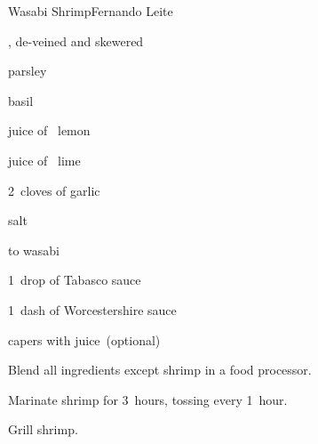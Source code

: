 \begin{recipe}{Wasabi Shrimp}{Fernando Leite}{}

\begin{ingredients}
\item {}, de-veined and skewered
\item parsley
\item basil
\item juice of \quarter~lemon
\item juice of \quarter~lime
\item 2~cloves of garlic
\item salt
\item \half to  wasabi
\item 1~drop of Tabasco sauce
\item 1~dash of Worcestershire sauce
\item capers with juice~(optional)
\end{ingredients}

\begin{directions}
\item Blend all ingredients except shrimp in a food processor.
\item Marinate shrimp for 3~hours, tossing every 1~hour.
\item Grill shrimp.
\end{directions}

\end{recipe}
